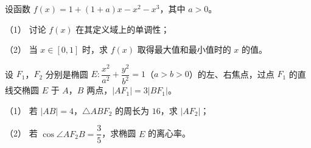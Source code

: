 \begin{question}
设函数 $f(x)=1+(1+a)x-x^2-x^3$，其中 $a>0$。

（1） 讨论 $f(x)$ 在其定义域上的单调性；

（2） 当 $x\in[0,1]$ 时，求 $f(x)$ 取得最大值和最小值时的 $x$ 的值。

\end{question}
\begin{question}
设 $F_1$，$F_2$ 分别是椭圆 $E:\dfrac{x^2}{a^2}+\dfrac{y^2}{b^2}=1$（$a>b>0$）的左、右焦点，过点 $F_1$ 的直线交椭圆 $E$ 于 $A$，$B$ 两点，$|AF_1|=3|BF_1|$。

（1） 若 $|AB|=4$，$\triangle ABF_2$ 的周长为 $16$，求 $|AF_2|$；

（2） 若 $\cos\angle AF_2B=\dfrac35$，求椭圆 $E$ 的离心率。

\end{question}